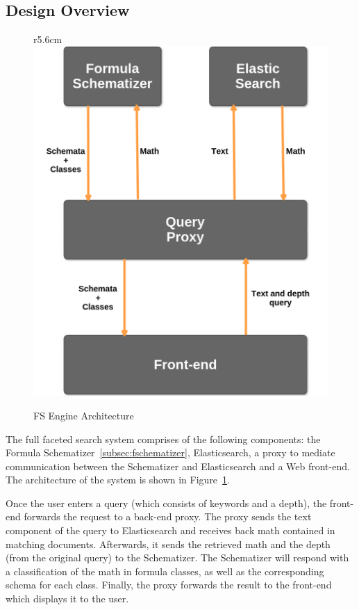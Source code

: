 \documentclass[a4paper,oneside]{article}
\begin{document}
\subsection{Design Overview}\label{subsec:design_overview}
\begin{figure}r{5.6cm}\vspace*{-1em}
    \includegraphics[scale=0.15]{img/SchemaArchitecture.png}
    \caption{FS Engine Architecture}\label{fig:sys_architecture}
\end{figure}

The full faceted search system comprises of the following components: the
Formula Schematizer~\ref{subsec:fschematizer}, Elasticsearch, a proxy to
mediate communication between the Schematizer and Elasticsearch and a Web
front-end. The architecture of the system is shown in
Figure~\ref{fig:sys_architecture}. 

Once the user enters a query (which consists of keywords and a depth), the
front-end forwards the request to a back-end proxy. The proxy sends the
text component of the query to Elasticsearch and receives back math
contained in matching documents. Afterwards, it sends the retrieved math
and the depth (from the original query) to the Schematizer. The Schematizer
will respond with a classification of the math in formula classes, as well
as the corresponding schema for each class. Finally, the proxy forwards the
result to the front-end which displays it to the user.
\end{document}
